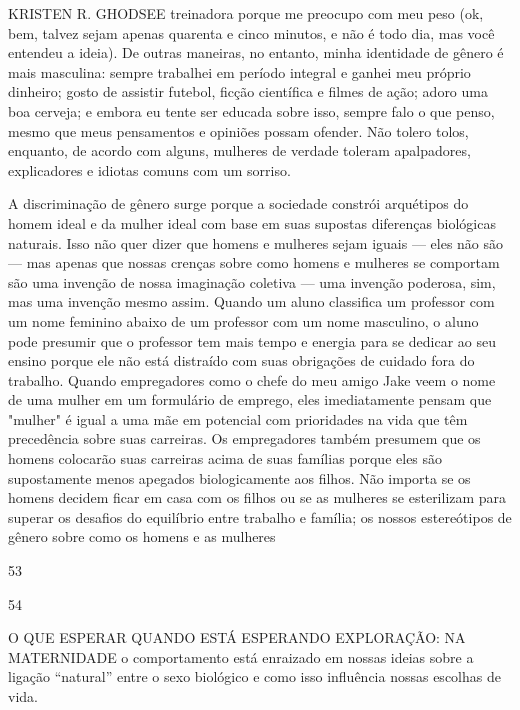  \par 
KRISTEN R. GHODSEE treinadora porque me preocupo com meu peso (ok, bem, talvez sejam apenas quarenta e cinco minutos, e não é todo dia, mas você entendeu a ideia). De outras maneiras, no entanto, minha identidade de gênero é mais masculina: sempre trabalhei em período integral e ganhei meu próprio dinheiro; gosto de assistir futebol, ficção científica e filmes de ação; adoro uma boa cerveja; e embora eu tente ser educada sobre isso, sempre falo o que penso, mesmo que meus pensamentos e opiniões possam ofender. Não tolero tolos, enquanto, de acordo com alguns, mulheres de verdade toleram apalpadores, explicadores e idiotas comuns com um sorriso.
 \par 
A discriminação de gênero surge porque a sociedade constrói arquétipos do homem ideal e da mulher ideal com base em suas supostas diferenças biológicas naturais. Isso não quer dizer que homens e mulheres sejam iguais — eles não são — mas apenas que nossas crenças sobre como homens e mulheres se comportam são uma invenção de nossa imaginação coletiva — uma invenção poderosa, sim, mas uma invenção mesmo assim. Quando um aluno classifica um professor com um nome feminino abaixo de um professor com um nome masculino, o aluno pode presumir que o professor tem mais tempo e energia para se dedicar ao seu ensino porque ele não está distraído com suas obrigações de cuidado fora do trabalho. Quando empregadores como o chefe do meu amigo Jake veem o nome de uma mulher em um formulário de emprego, eles imediatamente pensam que "mulher" é igual a uma mãe em potencial com prioridades na vida que têm precedência sobre suas carreiras. Os empregadores também presumem que os homens colocarão suas carreiras acima de suas famílias porque eles são supostamente menos apegados biologicamente aos filhos. Não importa se os homens decidem ficar em casa com os filhos ou se as mulheres se esterilizam para superar os desafios do equilíbrio entre trabalho e família; os nossos estereótipos de gênero sobre como os homens e as mulheres
 \par 
53
 \par 
54
 \par 
O QUE ESPERAR QUANDO ESTÁ ESPERANDO EXPLORAÇÃO: NA MATERNIDADE o comportamento está enraizado em nossas ideias sobre a ligação “natural” entre o sexo biológico e como isso influência nossas escolhas de vida.
 \par 
